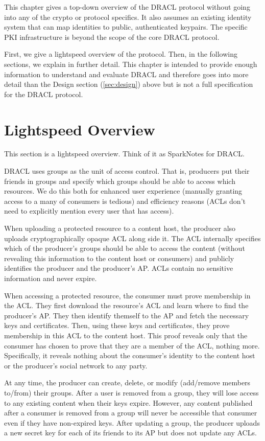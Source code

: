 \documentclass[pdftex,12pt,a4papaer,twoside,notitlepage]{report}
\begin{document}
This chapter gives a top-down overview of the DRACL protocol without going into
any of the crypto or protocol specifics. It also assumes an existing identity
system that can map identities to public, authenticated keypairs. The specific
PKI infrastructure is beyond the scope of the core DRACL protocol.

First, we give a lightspeed overview of the protocol. Then, in the following
sections, we explain in further detail. This chapter is intended to provide
enough information to understand and evaluate DRACL and therefore goes into more
detail than the Design section (\ref{sec:design}) above but is not a full
specification for the DRACL protocol.

\section{Lightspeed Overview}

This section is a lightspeed overview. Think of it as SparkNotes\texttrademark{}
for DRACL.

DRACL uses groups as the unit of access control. That is, producers put their
friends in groups and specify which groups should be able to access which
resources. We do this both for enhanced user experience (manually granting
access to a many of consumers is tedious) and efficiency reasons (ACLs don't
need to explicitly mention every user that has access).

When uploading a protected resource to a content host, the producer also uploads
cryptographically opaque ACL along side it. The ACL internally specifies which
of the producer's groups should be able to access the content (without revealing
this information to the content host or consumers) and publicly identifies the
producer and the producer's AP. ACLs contain no sensitive information and never
expire.

When accessing a protected resource, the consumer must prove membership in the
ACL. They first download the resource's ACL and learn where to find the
producer's AP. They then identify themself to the AP and fetch the necessary
keys and certificates. Then, using these keys and certificates, they prove
membership in this ACL to the content host. This proof reveals only that the
consumer has chosen to prove that they are a member of the ACL, nothing more.
Specifically, it reveals nothing about the consumer's identity to the content
host or the producer's social network to any party.

At any time, the producer can create, delete, or modify (add/remove members
to/from) their groups. After a user is removed from a group, they will lose
access to any existing content when their keys expire. However, any content
published after a consumer is removed from a group will never be accessible that
consumer even if they have non-expired keys. After updating a group, the
producer uploads a new secret key for each of its friends to its AP but does not
update any ACLs.
  
\end{document}
